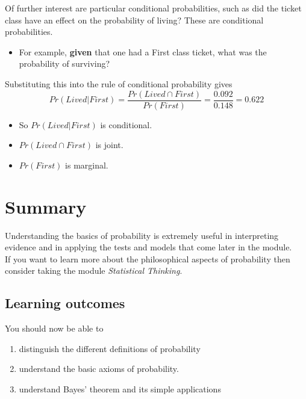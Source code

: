 \documentclass[
  oneside]{krantz}
\providecommand{\tightlist}{%
  \setlength{\itemsep}{0pt}\setlength{\parskip}{0pt}}
\begin{document}
Of further interest are particular conditional probabilities, such as
did the ticket class have an effect on the probability of living?
These are conditional probabilities.

\begin{itemize}
\tightlist
\item
  For example, \textbf{given} that one had a First class ticket, what was the probability of surviving?
\end{itemize}

Substituting this into the rule of conditional probability gives
\[Pr(Lived|First)  = \frac{Pr(Lived \cap First)} {Pr(First)} = \frac{0.092} {0.148} = 0.622\]

\begin{itemize}
\tightlist
\item
  So \(Pr(Lived|First)\) is conditional.
\item
  \(Pr(Lived \cap First)\) is joint.
\item
  \(Pr(First)\) is marginal.
\end{itemize}

\hypertarget{SUMprob}{%
\section{Summary}\label{SUMprob}}

Understanding the basics of probability is extremely useful in interpreting evidence and in applying the tests and models that come later in the module.\\
If you want to learn more about the philosophical aspects of probability then consider taking the module \emph{Statistical Thinking}.

\hypertarget{learning-outcomes-1}{%
\subsection{Learning outcomes}\label{learning-outcomes-1}}

You should now be able to

\begin{enumerate}
\def\labelenumi{\arabic{enumi}.}
\tightlist
\item
  distinguish the different definitions of probability
\item
  understand the basic axioms of probability.
\item
  understand Bayes' theorem and its simple applications
\end{enumerate}
\end{document}
